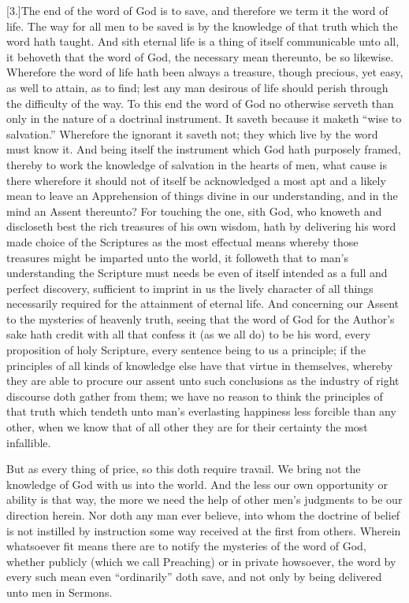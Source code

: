 [3.]The end of the word of God is to save, and therefore we term it the word of life. The way for all men to be saved is by the knowledge of that truth which the word hath taught. And sith eternal life is a thing of itself communicable unto all, it behoveth that the word of God, the necessary mean thereunto, be so likewise. Wherefore the word of life hath been always a treasure, though precious, yet easy, as well to attain, as to find; lest any man desirous of life should perish through the difficulty of the way. To this end the word of God no otherwise serveth than only in the nature of a doctrinal instrument. It saveth because it maketh “wise to salvation.” Wherefore the ignorant it saveth not; they which live by the word must know it. And being itself the instrument which God hath purposely framed, thereby to work the knowledge of salvation in the hearts of men, what cause is there wherefore it should not of itself be acknowledged a most apt and a likely mean to leave an Apprehension of things divine in our understanding, and in the mind an Assent thereunto? For touching the one, sith God, who knoweth and discloseth best the rich treasures of his own wisdom, hath by delivering his word made choice of the Scriptures as the most effectual means whereby those treasures might be imparted unto the world, it followeth that to man’s understanding the Scripture must needs be even of itself intended as a full and perfect discovery, sufficient to imprint in us the lively character of all things necessarily required for the attainment of eternal life. And concerning our Assent to the mysteries of heavenly truth,  seeing that the word of God for the Author’s sake hath credit with all that confess it (as we all do) to be his word, every proposition of holy Scripture, every sentence being to us a principle;
 if the principles of all kinds of knowledge else have that virtue in themselves, whereby they are able to procure our assent unto such conclusions as the industry of right discourse doth gather from them; we have no reason to think the principles of that truth which tendeth unto man’s everlasting happiness less forcible than any other, when we know that of all other they are for their certainty the most infallible.

But as every thing of price, so this doth require travail. We bring not the knowledge of God with us into the world. And the less our own opportunity or ability is that way, the more we need the help of other men’s judgments to be our direction herein. Nor doth any man ever believe, into whom the doctrine of belief is not instilled by instruction some way received at the first from others. Wherein whatsoever fit means there are to notify the mysteries of the word of God, whether publicly (which we call Preaching) or in private howsoever, the word by every such mean even “ordinarily” doth save, and not only by being delivered unto men in Sermons.


